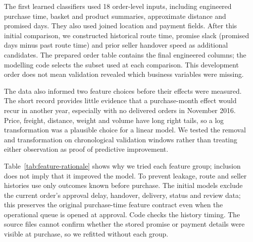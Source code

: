 \documentclass[12pt,a4paper]{article}
\begin{document}
The first learned classifiers used 18 order-level inputs, including engineered purchase time, basket and product summaries, approximate distance and promised days. They also used joined location and payment fields. After this initial comparison, we constructed historical route time, promise slack (promised days minus past route time) and prior seller handover speed as additional candidates. The prepared order table contains the final engineered columns; the modelling code selects the subset used at each comparison. This development order does not mean validation revealed which business variables were missing.

The data also informed two feature choices before their effects were measured. The short record provides little evidence that a purchase-month effect would recur in another year, especially with no delivered orders in November 2016. Price, freight, distance, weight and volume have long right tails, so a log transformation was a plausible choice for a linear model. We tested the removal and transformation on chronological validation windows rather than treating either observation as proof of predictive improvement.

Table~\ref{tab:feature-rationale} shows why we tried each feature group; inclusion does not imply that it improved the model. To prevent leakage, route and seller histories use only outcomes known before purchase. The initial models exclude the current order's approval delay, handover, delivery, status and review data; this preserves the original purchase-time feature contract even when the operational queue is opened at approval. Code checks the history timing. The source files cannot confirm whether the stored promise or payment details were visible at purchase, so we refitted without each group.
\end{document}
